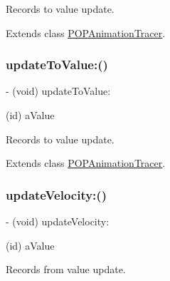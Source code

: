 Records to value update. 

Extends class \mbox{\hyperlink{interface_p_o_p_animation_tracer_a00d4c0e1b6b446081cfb6c153f37a633}{P\+O\+P\+Animation\+Tracer}}.

\mbox{\label{category_p_o_p_animation_tracer_07_internal_08_a00d4c0e1b6b446081cfb6c153f37a633}} 
\subsubsection{\texorpdfstring{update\+To\+Value\+:()}{updateToValue:()}\hspace{0.1cm}{\footnotesize\ttfamily [2/2]}}
{\footnotesize\ttfamily -\/ (void) update\+To\+Value\+: \begin{DoxyParamCaption}\item[{(id)}]{a\+Value }\end{DoxyParamCaption}}

Records to value update. 

Extends class \mbox{\hyperlink{interface_p_o_p_animation_tracer_a00d4c0e1b6b446081cfb6c153f37a633}{P\+O\+P\+Animation\+Tracer}}.

\mbox{\label{category_p_o_p_animation_tracer_07_internal_08_ab828c06696377e94ba3bdd490b5cd146}} 
\subsubsection{\texorpdfstring{update\+Velocity\+:()}{updateVelocity:()}\hspace{0.1cm}{\footnotesize\ttfamily [1/2]}}
{\footnotesize\ttfamily -\/ (void) update\+Velocity\+: \begin{DoxyParamCaption}\item[{(id)}]{a\+Value }\end{DoxyParamCaption}}

Records from value update. 

